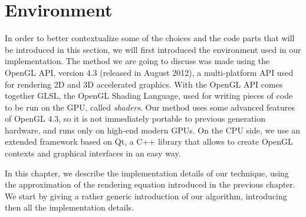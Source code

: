 \section{Environment}

In order to better contextualize some of the choices and the code parts that will be introduced in this section, we will first introduced the environment used in our implementation. The method we are going to discuss was made using the OpenGL API, version 4.3 (released in August 2012), a multi-platform API used for rendering 2D and 3D accelerated graphics. With the OpenGL API comes together GLSL, the OpenGL Shading Language, used for writing pieces of code to be run on the GPU, called \emph{shaders}. Our method uses some advanced features of OpenGL 4.3, so it is not immediately portable to previous generation hardware, and runs only on high-end modern GPUs. On the CPU side, we use an extended framework based on Qt, a C++ library that allows to create OpenGL contexts and graphical interfaces in an easy way.

In this chapter, we describe the implementation details of our technique, using the approximation of the rendering equation introduced in the previous chapter. We start by giving a rather generic introduction of our algorithm, introducing then all the implementation details. 


%
%
%
%

